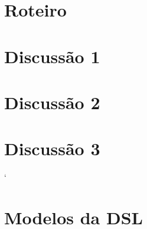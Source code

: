 \begin{apendicesenv}
\section{Roteiro} \label{ap:RoteiroGP}
    \begin{figure}
        \centering
         
    \end{figure}
\newpage
\section{Discussão 1} \label{ap:Disc1GP}
    \begin{figure}[!htb]
        \centering
        
    \end{figure}
\newpage
\section{Discussão 2} \label{ap:Disc2GP}
    \begin{figure}
        \centering
         
    \end{figure}
\newpage
\section{Discussão 3}`\label{ap:Disc3GP}
    \begin{figure}
        \centering
         
    \end{figure}
\newpage
\section{Modelos da DSL} \label{ap:ModelosGP}
    \begin{figure}
        \centering
         
    \end{figure}
\newpage


\end{apendicesenv}
